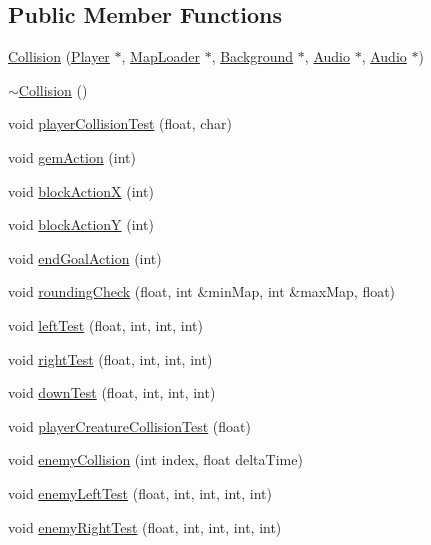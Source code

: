 \subsection*{Public Member Functions}
\begin{DoxyCompactItemize}
\item 
\hyperlink{class_collision_ab68555b1c6f7d02a4af26f538a5422a9}{Collision} (\hyperlink{class_player}{Player} $\ast$, \hyperlink{class_map_loader}{Map\+Loader} $\ast$, \hyperlink{class_background}{Background} $\ast$, \hyperlink{class_audio}{Audio} $\ast$, \hyperlink{class_audio}{Audio} $\ast$)
\item 
\hyperlink{class_collision_a19ae49bcb3b16f4622443a34a171590c}{$\sim$\+Collision} ()
\item 
void \hyperlink{class_collision_a79a33125bb8ef50a883822b4c80b71ae}{player\+Collision\+Test} (float, char)
\item 
void \hyperlink{class_collision_a8a7c7bbaa789c0867559d79ef186dd84}{gem\+Action} (int)
\item 
void \hyperlink{class_collision_a8daccc0201f916f571afbbd8da992ffb}{block\+Action\+X} (int)
\item 
void \hyperlink{class_collision_ac4b2ae74fb5978743580f25ac2760f3a}{block\+Action\+Y} (int)
\item 
void \hyperlink{class_collision_aff0b810980a84e644e531da82487d8c8}{end\+Goal\+Action} (int)
\item 
void \hyperlink{class_collision_a7b13afe2227a341d094d5bcb5e8e4905}{rounding\+Check} (float, int \&min\+Map, int \&max\+Map, float)
\item 
void \hyperlink{class_collision_a0cd628e6adcb69e216f9b469fa7c029c}{left\+Test} (float, int, int, int)
\item 
void \hyperlink{class_collision_a5aff01e79c9c42e7d71a57de7412dc58}{right\+Test} (float, int, int, int)
\item 
void \hyperlink{class_collision_a7c33a20a9c111630eeb8f0202605161e}{down\+Test} (float, int, int, int)
\item 
void \hyperlink{class_collision_ac758fa708f12d9121bb2aacc787111e4}{player\+Creature\+Collision\+Test} (float)
\item 
void \hyperlink{class_collision_a1c110f14ff463a255694f387eec17d56}{enemy\+Collision} (int index, float delta\+Time)
\item 
void \hyperlink{class_collision_a359e9c49d721476b11b43e92d7c61723}{enemy\+Left\+Test} (float, int, int, int, int)
\item 
void \hyperlink{class_collision_aa046c7cf6f057848700d89101953b678}{enemy\+Right\+Test} (float, int, int, int, int)
\end{DoxyCompactItemize}


